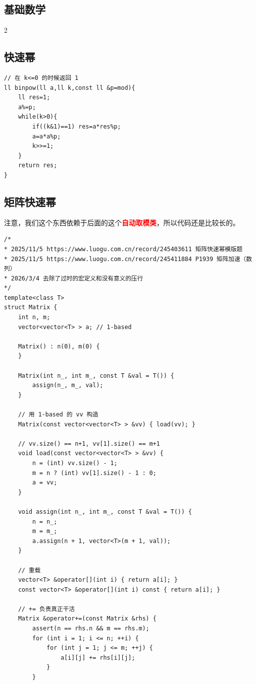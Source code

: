 	\begin{center}
		\section{基础数学}
	\end{center}

	\begin{multicols*}{2} %

		\subsection{快速幂}


		\begin{verbatim}
// 在 k<=0 的时候返回 1
ll binpow(ll a,ll k,const ll &p=mod){
	ll res=1;
	a%=p;
	while(k>0){
		if((k&1)==1) res=a*res%p;
		a=a*a%p;
		k>>=1;
	}
	return res;
}
		\end{verbatim}

		\subsection{矩阵快速幂}

		注意，我们这个东西依赖于后面的这个\textcolor{red}{\textbf{自动取模类}}，所以代码还是比较长的。

		\begin{verbatim}
/*
* 2025/11/5 https://www.luogu.com.cn/record/245403611 矩阵快速幂模版题
* 2025/11/5 https://www.luogu.com.cn/record/245411884 P1939 矩阵加速（数列）
* 2026/3/4 去除了过时的宏定义和没有意义的压行
*/
template<class T>
struct Matrix {
	int n, m;
	vector<vector<T> > a; // 1-based

	Matrix() : n(0), m(0) {
	}

	Matrix(int n_, int m_, const T &val = T()) {
		assign(n_, m_, val);
	}

	// 用 1-based 的 vv 构造
	Matrix(const vector<vector<T> > &vv) { load(vv); }

	// vv.size() == n+1, vv[1].size() == m+1
	void load(const vector<vector<T> > &vv) {
		n = (int) vv.size() - 1;
		m = n ? (int) vv[1].size() - 1 : 0;
		a = vv;
	}

	void assign(int n_, int m_, const T &val = T()) {
		n = n_;
		m = m_;
		a.assign(n + 1, vector<T>(m + 1, val));
	}

	// 重载
	vector<T> &operator[](int i) { return a[i]; }
	const vector<T> &operator[](int i) const { return a[i]; }

	// += 负责真正干活
	Matrix &operator+=(const Matrix &rhs) {
		assert(n == rhs.n && m == rhs.m);
		for (int i = 1; i <= n; ++i) {
			for (int j = 1; j <= m; ++j) {
				a[i][j] += rhs[i][j];
			}
		}


\end{verbatim}
\end{multicols*}
